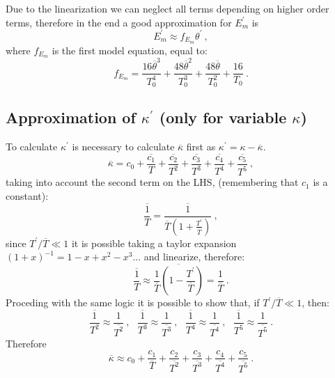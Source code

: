 \documentclass[10pt]{article}
\def\tm{\overline{\theta}}
\begin{document}
Due to the linearization we can neglect all terms depending on higher order terms, therefore in the end a good approximation for $E_m^\prime$ is
\begin{equation*}
E_m^\prime \approx f_{E_m} \theta^\prime \ ,
\end{equation*}
where $f_{E_m}$ is the first model equation, equal to:
\begin{equation*}
f_{E_m} =  \frac{16 \tm^3}{T_0^4} + \frac{48 \tm^2}{T_0^3} + \frac{48 \tm}{T_0^2} + \frac{16}{T_0} \ .
\end{equation*}

\subsection*{Approximation of $\kappa^\prime$ (only for variable $\kappa$)}
To calculate $\kappa^\prime$ is necessary to calculate $\overline{\kappa}$ first as $\kappa^\prime = \kappa - \overline{\kappa}$.
\begin{equation*}
\overline{\kappa} = c_0 + \overline{\frac{c_1}{T}} + \overline{\frac{c_2}{T^2}} + \overline{\frac{c_3}{T^3}} + \overline{\frac{c_4}{T^4}} + \overline{\frac{c_5}{T^5}} \ ,
\end{equation*}
taking into account the second term on the LHS, (remembering that $c_1$ is a constant):
\begin{equation*}
\overline{\frac{1}{T}} = \overline{\frac{1}{\overline{T}(1+\frac{T^\prime}{\overline{T}})}} \ ,
\end{equation*}
since $T^\prime/\overline{T} \ll 1$ it is possible taking a taylor expansion ${(1+x)^{-1} = 1-x+x^2-x^3 ...}$ and linearize, therefore:
\begin{equation*}
\overline{\frac{1}{T}} \approx \overline{\frac{1}{\overline{T}}(1 - \frac{T^\prime}{\overline{T}})} = \frac{1}{\overline{T}} \ .
\end{equation*}
Proceding with the same logic it is possible to show that, if $T^\prime/\overline{T} \ll 1$, then:
\begin{equation*}
\overline{\frac{1}{T^2}} \approx \frac{1}{\overline{T^2}} \ , \ \ \ \overline{\frac{1}{T^3}} \approx \frac{1}{\overline{T^3}} \ , \ \ \ \overline{\frac{1}{T^4}} \approx \frac{1}{\overline{T^4}} \ , \ \ \ \overline{\frac{1}{T^5}} \approx \frac{1}{\overline{T^5}} \ .  
\end{equation*}
Therefore
\begin{equation*}
\overline{\kappa} \approx c_0 + \frac{c_1}{\overline{T}} + \frac{c_2}{\overline{T^2}} + \frac{c_3}{\overline{T^3}} + \frac{c_4}{\overline{T^4}} + \frac{c_5}{\overline{T^5}} \ .
\end{equation*}
\end{document}
